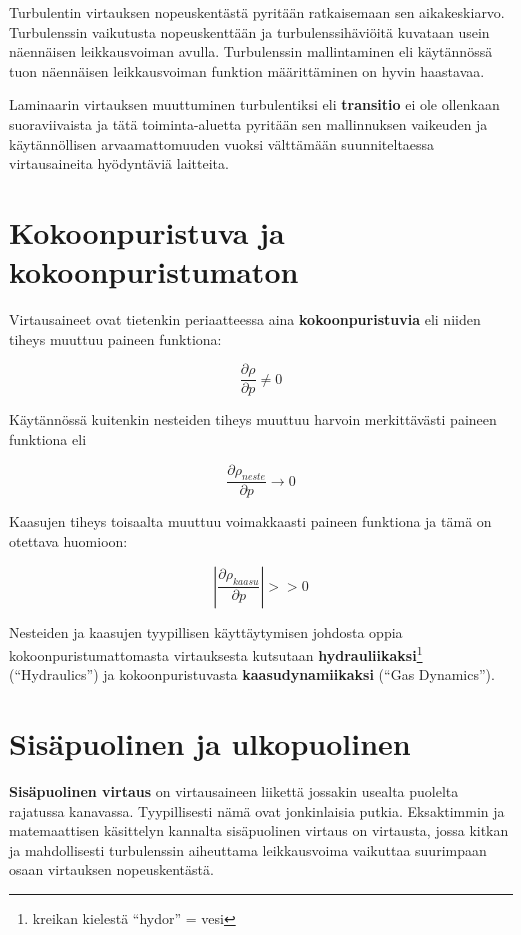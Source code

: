 \documentclass[12pt,a4paper,finnish]{book}
\begin{document}
Turbulentin virtauksen nopeuskentästä pyritään ratkaisemaan sen aikakeskiarvo. Turbulenssin 
vaikutusta nopeuskenttään ja turbulenssihäviöitä kuvataan usein näennäisen leikkausvoiman avulla. 
Turbulenssin mallintaminen eli käytännössä tuon näennäisen leikkausvoiman funktion määrittäminen 
on hyvin haastavaa.

Laminaarin virtauksen muuttuminen turbulentiksi eli \textbf{transitio} ei ole ollenkaan suoraviivaista 
ja tätä toiminta-aluetta pyritään sen mallinnuksen vaikeuden ja käytännöllisen arvaamattomuuden vuoksi 
välttämään suunniteltaessa virtausaineita hyödyntäviä laitteita.

\section{Kokoonpuristuva ja kokoonpuristumaton}
Virtausaineet ovat tietenkin periaatteessa aina \textbf{kokoonpuristuvia} eli niiden 
tiheys muuttuu paineen funktiona:

\begin{equation}
 \frac{\partial \rho}{\partial p} \neq 0
\end{equation}

Käytännössä kuitenkin nesteiden tiheys muuttuu harvoin merkittävästi paineen funktiona eli

\begin{equation}
 \frac{\partial \rho_{neste}}{\partial p} \rightarrow 0
\end{equation}

Kaasujen tiheys toisaalta muuttuu voimakkaasti paineen funktiona ja tämä on otettava huomioon:

\begin{equation}
 \left|\frac{\partial \rho_{kaasu}}{\partial p}\right| >> 0
\end{equation}

Nesteiden ja kaasujen tyypillisen käyttäytymisen johdosta oppia kokoonpuristumattomasta virtauksesta 
kutsutaan \textbf{hydrauliikaksi}\footnote{kreikan kielestä ``hydor'' = vesi} (``Hydraulics'') ja 
kokoonpuristuvasta \textbf{kaasudynamiikaksi} (``Gas Dynamics'').

\section{Sisäpuolinen ja ulkopuolinen}
\textbf{Sisäpuolinen virtaus} on virtausaineen liikettä jossakin usealta puolelta rajatussa kanavassa. 
Tyypillisesti nämä ovat jonkinlaisia putkia. Eksaktimmin ja matemaattisen käsittelyn kannalta 
sisäpuolinen virtaus on virtausta, jossa kitkan ja mahdollisesti turbulenssin aiheuttama 
leikkausvoima vaikuttaa suurimpaan osaan virtauksen nopeuskentästä.
\end{document}
